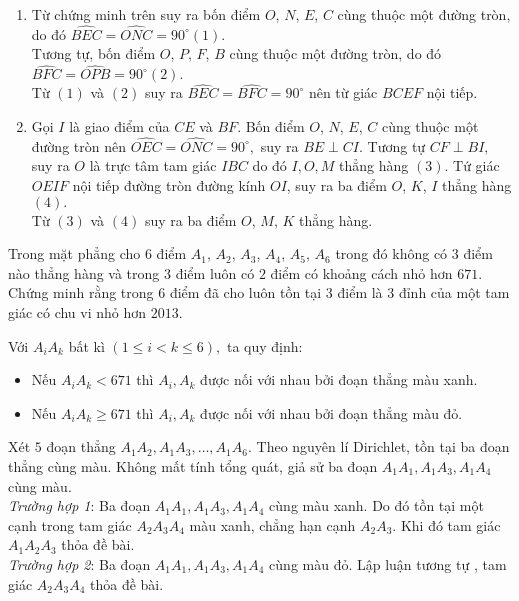 \begin{ex}
{\begin{enumerate}
   		\item   Từ chứng minh trên suy ra bốn điểm $O$, $N$, $E$, $C$ cùng thuộc một đường tròn, do đó $\widehat{BEC}=\widehat{ONC}=90^{\circ} (1).$\\
   		Tương tự, bốn điểm $O$, $P$, $F$, $B$ cùng thuộc một đường tròn, do đó $\widehat{BFC}=\widehat{OPB}=90^{\circ} (2).$\\
   		Từ $(1)$ và $(2)$ suy ra $\widehat{BEC}=\widehat{BFC}=90^{\circ}$ nên từ giác $BCEF$ nội tiếp.
   		\item  Gọi $I$ là giao điểm của $CE$ và $BF$. Bốn điểm $O$, $N$, $E$, $C$ cùng thuộc một đường tròn nên $\widehat{OEC}=\widehat{ONC}=90^{\circ},$  suy ra $BE \perp CI.$ Tương tự $CF \perp BI,$ suy ra $O$ là trực tâm tam giác $IBC$ do đó $I, O, M$ thẳng hàng $(3).$ Tứ giác $OEIF$ nội tiếp đường tròn đường kính $OI$, suy ra ba điểm $O$, $K$, $I$ thẳng hàng $(4).$\\
   		Từ $(3)$ và $(4)$ suy ra ba điểm $O$, $M$, $K$ thẳng hàng.
   	\end{enumerate}
   }
\end{ex}
\begin{ex}%
    Trong mặt phẳng cho $6$ điểm $A_1$, $A_2$,  $A_3$, $A_4$, $A_5$, $A_6$ trong đó không có $3$ điểm nào thẳng hàng và trong $3$ điểm luôn có $2$ điểm có khoảng cách nhỏ hơn $671$. Chứng minh rằng trong $6$ điểm đã cho luôn tồn tại $3$ điểm là $3$ đỉnh của một tam giác có chu vi nhỏ hơn $2013$. 
\loigiai
      {
    	Với $A_iA_k$ bất kì $(1\leq i<k \leq 6),$ ta quy định:
    	\begin{itemize}
    		\item Nếu $A_iA_k<671$ thì $A_i, A_k$ được nối với nhau bởi đoạn thẳng màu xanh.
    		\item Nếu $A_iA_k\geq 671$ thì $A_i, A_k$ được nối với nhau bởi đoạn thẳng màu đỏ.
    	\end{itemize}
    	Xét $5$ đoạn thẳng $A_1A_2,A_1A_3,\dotsc, A_1A_6.$ Theo nguyên lí Dirichlet, tồn tại ba đoạn thẳng cùng màu. Không mất tính tổng quát, giả sử ba đoạn $A_1A_1, A_1A_3, A_1A_4$ cùng màu.\\
    	\textit{Trường hợp 1}: Ba đoạn $A_1A_1, A_1A_3, A_1A_4$ cùng màu xanh. Do đó tồn tại một cạnh trong tam giác $A_2A_3A_4$ màu xanh, chẳng hạn cạnh $A_2A_3.$ Khi đó tam giác $A_1A_2A_3$ thỏa đề bài.\\
    	\textit{Trường hợp 2}: Ba đoạn $A_1A_1, A_1A_3, A_1A_4$ cùng màu đỏ. Lập luận tương tự , tam giác $A_2A_3A_4$ thỏa đề bài.
    }
\end{ex}

